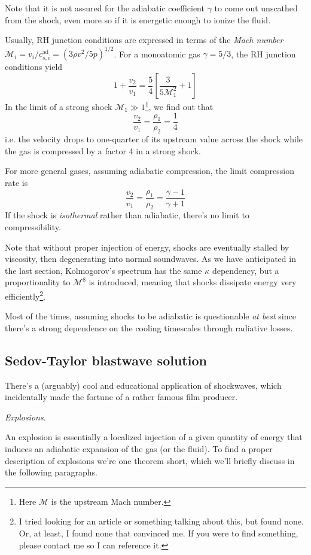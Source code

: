 Note that it is not assured for the adiabatic coefficient $\gamma$ to come out unscathed from the shock, even more so if it is energetic enough to ionize the fluid.
\par Usually, RH junction conditions are expressed in terms of the \emph{Mach number} $\mathcal{M}_{i} = v_{i}/c_{s,i}^{\text{ad}} = (3\rho v^{2}/5p)^{1/2}$. For a monoatomic gas $\gamma = 5/3$, the RH junction conditions yield
\begin{equation*}
    1+\frac{v_{2}}{v_{1}} = \frac{5}{4}\left[\frac{3}{5\mathcal{M}_{1}^{2}}+1\right]
\end{equation*}
In the limit of a strong shock $\mathcal{M}_{1} \gg 1$\footnote{Here $\mathcal{M}$ is the upstream Mach number.}, we find out that 
\begin{equation*}
    \frac{v_{2}}{v_{1}} = \frac{\rho_{1}}{\rho_{2}} = \frac{1}{4}
\end{equation*}
i.e. the velocity drops to one-quarter of its upstream value across the shock while the gas is compressed by a factor 4 in a strong shock.
\par For more general gases, assuming adiabatic compression, the limit compression rate is 
\begin{equation*}
    \frac{v_{2}}{v_{1}} = \frac{\rho_{1}}{\rho_{2}} = \frac{\gamma -1}{\gamma +1}
\end{equation*}
If the shock is \emph{isothermal} rather than adiabatic, there's no limit to compressibility.
\par Note that without proper injection of energy, shocks are eventually stalled by viscosity, then degenerating into normal soundwaves. As we have anticipated in the last section, Kolmogorov's spectrum has the same $\kappa$ dependency, but a proportionality to $\mathcal{M}^{8}$ is introduced, meaning that shocks dissipate energy very efficiently\footnote{I tried looking for an article or something talking about this, but found none. Or, at least, I found none that convinced me. If you were to find something, please contact me so I can reference it.}.
\par Most of the times, assuming shocks to be adiabatic is questionable \emph{at best} since there's a strong dependence on the cooling timescales through radiative losses.
\subsection{Sedov-Taylor blastwave solution}
There's a (arguably) cool and educational application of shockwaves, which incidentally made the fortune of a rather famous film producer.
\par \emph{Explosions}.
\par An explosion is essentially a localized injection of a given quantity of energy that induces an adiabatic expansion of the gas (or the fluid). To find a proper description of explosions we're one theorem short, which we'll briefly discuss in the following paragraphs.
